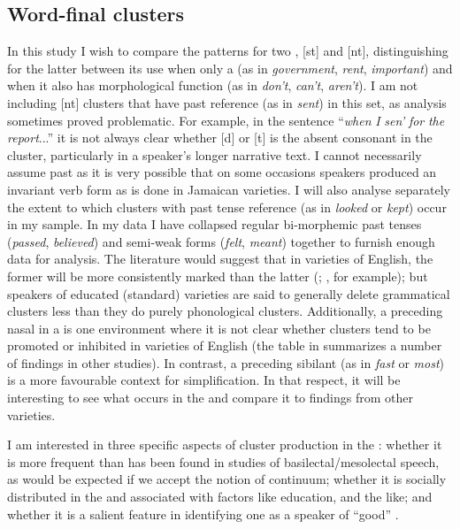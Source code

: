\subsection{Word-final clusters}%
In this study I wish to compare the patterns for two , [st] and [nt], distinguishing for the latter between its use when only a  (as in \textit{government}, \textit{rent}, \textit{important}) and when it also has morphological function (as in \textit{don’t}, \textit{can’t}, \textit{aren’t}).  I am not including [nt] clusters that have past reference (as in \textit{sent}) in this set, as analysis sometimes proved problematic.  For example, in the sentence “\textit{when} \textit{I} \textit{sen’} \textit{for} \textit{the} \textit{report}...” it is not always clear whether [d] or [t] is the absent consonant in the cluster, particularly in a speaker’s longer narrative text.  I cannot necessarily assume past  as it is very possible that on some occasions speakers produced an invariant verb form as is done in Jamaican varieties.  I will also analyse separately the extent to which clusters with past tense reference (as in \textit{looked} or \textit{kept}) occur in my sample.  In my data I have collapsed regular bi-morphemic past tenses (\textit{passed}, \textit{believed}) and semi-weak forms (\textit{felt}, \textit{meant}) together to furnish enough data for analysis.  The literature would suggest that in varieties of English, the former will be more consistently marked than the latter (\citealt[5]{Guy1980}; \citealt[47]{Neu1980}, for example); but speakers of educated (standard) varieties are said to generally delete grammatical clusters less than they do purely phonological clusters.  Additionally, a preceding nasal in a  is one environment where it is not clear whether clusters tend to be promoted or inhibited in varieties of English (the table in \citealt[131]{Patrick1999} summarizes a number of findings in other studies).  In contrast, a preceding sibilant (as in \textit{fast} or \textit{most}) is a more favourable context for simplification.  In that respect, it will be interesting to see what occurs in the  and compare it to findings from other varieties.  

I am interested in three specific aspects of cluster production in the : whether it is more frequent than has been found in studies of basilectal\slash mesolectal speech, as would be expected if we accept the notion of continuum; whether it is socially distributed in the  and associated with factors like education,  and the like; and whether it is a salient feature in identifying one as a speaker of “good” .   

